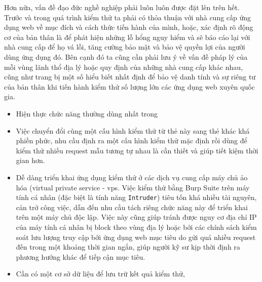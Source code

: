 Hơn nữa, vấn đề đạo đức nghề nghiệp phải luôn luôn được đặt lên trên hết. Trước và trong quá trình kiểm thử ta phải có thỏa thuận với nhà cung cấp ứng dụng web về mục đích và cách thức tiến hành của mình, hoặc, xác định rõ động cơ của bản thân là để phát hiện những lỗ hổng nguy hiểm và sẽ báo cáo lại với nhà cung cấp để họ vá lỗi, tăng cường bảo mật và bảo vệ quyền lợi của người dùng ứng dụng đó. Bên cạnh đó ta cũng cần phải lưu ý về vấn đề pháp lý của mỗi vùng lãnh thổ địa lý hoặc quy định của những nhà cung cấp khác nhau, cũng như trang bị một số hiểu biết nhất định để bảo vệ danh tính và sự riêng tư của bản thân khi tiến hành kiểm thử số lượng lớn các ứng dụng web xuyên quốc gia.\par

\begin{itemize}
    \item Hiện thực chức năng thường dùng nhất trong 
    \item Việc chuyển đổi cùng một cấu hình kiểm thử từ thẻ này sang thẻ khác khá phiền phức, nhu cầu định ra một cấu hình kiểm thử mặc định rồi dùng để kiểm thử nhiều request mẫu tương tự nhau là cần thiết và giúp tiết kiệm thời gian hơn.
    \item Dễ dàng triển khai ứng dụng kiểm thử ở các dịch vụ cung cấp máy chủ ảo hóa (virtual private service - \acrshort{vps}. Việc kiểm thử bằng Burp Suite trên máy tính cá nhân (đặc biệt là tính năng \texttt{Intruder}) tiêu tốn khá nhiều tài nguyên, cản trở công việc, dẫn đến nhu cầu tách riêng chức năng này để triển khai trên một máy chủ độc lập. Việc này cũng giúp tránh được nguy cơ địa chỉ IP của máy tính cá nhân bị block theo vùng địa lý hoặc bởi các chính sách kiểm soát lưu lượng truy cập bởi ứng dụng web mục tiêu do gửi quá nhiều request đến trong một khoảng thời gian ngắn, giúp người kỹ sư kịp thời định ra phương hướng khác để tiếp cận mục tiêu.
    \item Cần có một cơ sở dữ liệu để lưu trữ kết quả kiểm thử,
\end{itemize}


